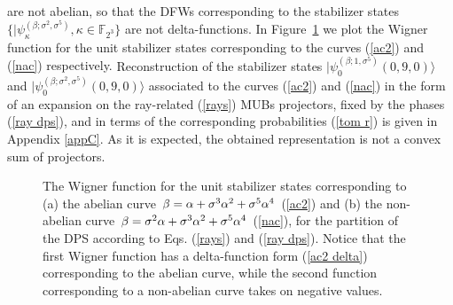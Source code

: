 \documentclass[quantumrep,article,submit,pdftex,moreauthors]{Definitions/mdpi}
\begin{document}
are not abelian, so that the DFWs corresponding to the stabilizer states
$\{|\psi_\kappa^{(\beta; \sigma^2, \sigma^{5})}, \kappa \in \mathbb F_{2^3}\}$
are not delta-functions. In Figure~\ref{fig2} we plot the Wigner function for
the unit stabilizer states corresponding to the curves (\ref{ac2}) and
(\ref{nac}) respectively.  {\color{teal}Reconstruction of the stabilizer states
  $|\psi_{0}^{(\beta ; 1,\sigma^{5})}(0,9,0)\rangle$ and $|\psi_{0}^{(\beta
  ;\sigma ^{2},\sigma^{5})}(0,9,0)\rangle$ associated to the curves (\ref{ac2})
  and (\ref{nac}) in the form of an expansion on the ray-related (\ref{rays})
MUBs projectors, fixed by the phases (\ref{ray dps}), and in terms of the
corresponding probabilities (\ref{tom r}) is given in Appendix \ref{appC}. As it
is expected, the obtained representation is not a convex sum of projectors.}

\begin{figure}[ht]
  \centering
  \quad 
  \caption{
    The Wigner function for the unit stabilizer states corresponding to (a) the
    abelian curve $\protect\beta = \protect\alpha + \protect\sigma^3
    \protect\alpha^2 + \protect\sigma^5 \protect\alpha^4$ (\protect\ref{ac2})
    and (b) the non-abelian curve $\protect\beta = \protect\sigma^2 \protect
    \alpha + \protect\sigma^3 \protect\alpha^2 +
    \protect\sigma^{5}\protect\alpha^{4}$ (\protect\ref{nac}), for the partition
    of the DPS according to Eqs. (\protect\ref{rays}) and (\protect\ref{ray
    dps}). Notice that the first Wigner function has a delta-function form
    (\protect\ref{ac2 delta}) corresponding to the abelian curve, while the
    second function corresponding to a non-abelian curve takes on negative
    values.
  }
  \label{fig2}
\end{figure}
\end{document}

